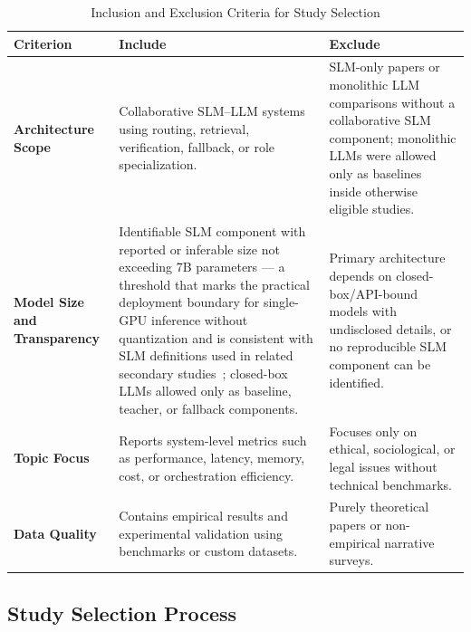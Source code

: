 \begin{table}[!htbp]
    \centering
    \caption{Inclusion and Exclusion Criteria for Study Selection}
    \label{tab:eligibility_criteria}
    \footnotesize
    \setlength{\tabcolsep}{3pt}
    \renewcommand{\arraystretch}{0.94}
    \begin{tabularx}{\linewidth}{@{} p{2.05cm} >{\raggedright\arraybackslash}X >{\raggedright\arraybackslash}X @{}}
        \toprule
        \textbf{Criterion} & \textbf{Include} & \textbf{Exclude} \\
        \midrule
        
        \textbf{Architecture Scope} & 
        Collaborative SLM--LLM systems using routing, retrieval, verification, fallback, or role specialization. & 
        SLM-only papers or monolithic LLM comparisons without a collaborative SLM component; monolithic LLMs were allowed only as baselines inside otherwise eligible studies. \\
        
        \textbf{Model Size and Transparency} &
        Identifiable SLM component with reported or inferable size not exceeding 7B parameters --- a threshold that marks the practical deployment boundary for single-GPU inference without quantization and is consistent with SLM definitions used in related secondary studies~\cite{slmreview2025prisma,wang2024slmsurvey}; closed-box LLMs allowed only as baseline, teacher, or fallback components. &
        Primary architecture depends on closed-box/API-bound models with undisclosed details, or no reproducible SLM component can be identified. \\
        
        \textbf{Topic Focus} & 
        Reports system-level metrics such as performance, latency, memory, cost, or orchestration efficiency. & 
        Focuses only on ethical, sociological, or legal issues without technical benchmarks. \\
        
        \textbf{Data Quality} & 
        Contains empirical results and experimental validation using benchmarks or custom datasets. & 
        Purely theoretical papers or non-empirical narrative surveys. \\
        
        \bottomrule
    \end{tabularx}
\end{table}

\subsection{Study Selection Process}
\label{sec:study_selection}

